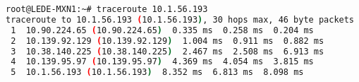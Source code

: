 \begin{lstlisting}[language=bash, caption={Traceroute from LEDE-MXN1 to BCNLlenguadoc17Rack.}]
root@LEDE-MXN1:~# traceroute 10.1.56.193
traceroute to 10.1.56.193 (10.1.56.193), 30 hops max, 46 byte packets
 1  10.90.224.65 (10.90.224.65)  0.335 ms  0.258 ms  0.204 ms
 2  10.139.92.129 (10.139.92.129)  1.004 ms  0.911 ms  0.882 ms
 3  10.38.140.225 (10.38.140.225)  2.467 ms  2.508 ms  6.913 ms
 4  10.139.95.97 (10.139.95.97)  4.369 ms  4.054 ms  3.815 ms
 5  10.1.56.193 (10.1.56.193)  8.352 ms  6.813 ms  8.098 ms
\end{lstlisting}